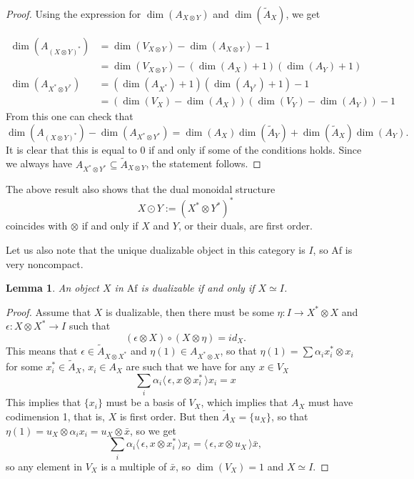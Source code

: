 \documentclass[12pt]{article}
\newtheorem{lemma}{Lemma}
\theoremstyle{definition}
\theoremstyle{remark}
\def\<{\langle\,}
\def\>{\,\rangle}
\def \Af{\mathrm{Af}}
\def\bI{I}
\def\bX{ X}
\def\bY{ Y}
\begin{document}
\begin{proof} Using the expression for $\dim(A_{\bX\otimes\bY})$ and $\dim(\tilde A_\bX)$,
we get

\begin{align*}
\dim(A_{(\bX\otimes \bY)^*})&=\dim(V_{\bX\otimes \bY})-\dim(A_{\bX\otimes \bY})-1\\
&=\dim(V_{\bX\otimes \bY})-(\dim(A_\bX)+1)(\dim(A_\bY)+1)\\
\dim(A_{\bX^*\otimes \bY^*})&=(\dim(A_{\bX^*})+1)(\dim(A_{\bY^*})+1)-1\\
&=(\dim(V_\bX)-\dim(A_\bX))(\dim(V_\bY)-\dim(A_\bY))-1
\end{align*}
From this one can check that 
\[
\dim(A_{(\bX\otimes \bY)^*})-\dim(A_{\bX^*\otimes \bY^*})=\dim(A_\bX)\dim(\tilde
A_\bY)+\dim(\tilde A_\bX)\dim(A_\bY).
\]
It is clear that this is equal to 0 if and only if some of the conditions holds. Since 
we always have $A_{\bX^*\otimes \bY^*}\subseteq \tilde A_{\bX\otimes\bY}$, the statement
follows.

\end{proof}

The above result also shows that the dual monoidal structure 
\[
\bX\odot \bY:=(\bX^*\otimes
\bY^*)^*
\]
coincides with $\otimes$ if and only if $\bX$ and $\bY$, or their duals, are
first order.



Let us also note that the unique dualizable object in this category is $\bI$, so $\Af$ is
very noncompact. 
\begin{lemma}\label{lemma:dualizable}
An object $\bX$ in $\Af$  is dualizable if and only if $\bX\simeq \bI$.
\end{lemma}

\begin{proof} Assume that $\bX$ is dualizable, 
then there must be some $\eta: \bI\to
\bX^*\otimes \bX$ and $\epsilon: \bX\otimes \bX^*\to I$ such that 
\[
(\epsilon\otimes \bX)\circ (\bX\otimes \eta)=id_\bX.
\]
This means that $\epsilon \in \tilde A_{\bX\otimes \bX^*}$ and  $\eta(1)\in A_{\bX^*\otimes
\bX}$, so that $\eta(1)=\sum\alpha_i x_i^*\otimes x_i$ for some $x_i^*\in \tilde A_\bX$,
$x_i\in A_\bX$ are  such that we have for any $x\in V_\bX$
\[
\sum_i\alpha_i\<\epsilon,x\otimes x_i^*\>x_i=x
\]
This implies that $\{x_i\}$ must be a basis of $V_\bX$, which implies that $A_\bX$ must
have codimension 1, that is, $\bX$ is first order. But then $\tilde A_\bX=\{u_\bX\}$, so
that $\eta(1)=u_\bX\otimes \alpha_i x_i=u_\bX\otimes \bar x$, so we get 
\[
\sum_i\alpha_i\<\epsilon,x\otimes x_i^*\>x_i=\<\epsilon,x\otimes u_\bX\>\bar x,
\]
so any element in $V_\bX$ is a multiple of $\bar x$, so $\dim(V_\bX)=1$ and $\bX\simeq 
\bI$.
\end{proof}
\end{document}
